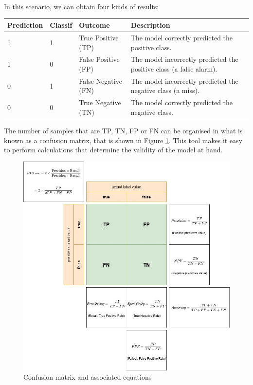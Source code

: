 		In this scenario,  we can obtain four kinds of results:
		
		\begin{table}[!ht]
			\centering
			\begin{tabular}{|l|l|l|p{2cm}|}
				\hline
				Prediction & Classif & Outcome & Description \\ \hline\hline
				1 & 1 & True Positive (TP) & The model correctly predicted the positive class. \\ \hline
				1 & 0 & False Positive (FP) & The model incorrectly predicted the positive class (a false alarm). \\ \hline
				0 & 1 & False Negative (FN) & The model incorrectly predicted the negative class (a miss). \\ \hline
				0 & 0 & True Negative (TN) & The model correctly predicted the negative class. \\ \hline
			\end{tabular}
		\end{table}
		
		The number of samples that are TP, TN, FP or FN can be organised in what is known as a confusion matrix, that is shown in Figure \ref{fig:confusionmatrix}. This tool makes it easy to perform calculations that determine the validity of the model at hand.
		
		\begin{figure}[H]
			\centering
			\includegraphics[width=0.9\linewidth]{img/confusion_matrix}
			\caption{Confusion matrix and associated equations}
			\label{fig:confusionmatrix}
		\end{figure}
		
